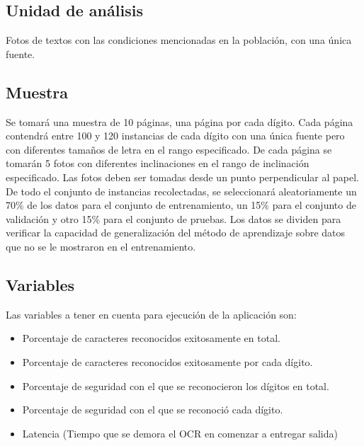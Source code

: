 \documentclass[a4paper, 11pt, oneside]{report}
\begin{document}
\subsection{Unidad de análisis}

Fotos de textos con las condiciones mencionadas en la población, con una única fuente.

\subsection{Muestra}

Se tomará una muestra de 10 páginas, una página por cada dígito. Cada página contendrá entre 100 y 120 instancias de cada dígito con una única fuente pero con diferentes tamaños de letra en el rango especificado. De cada página se tomarán 5 fotos con diferentes inclinaciones en el rango de inclinación especificado. Las fotos deben ser tomadas desde un punto perpendicular al papel. De todo el conjunto de instancias recolectadas, se seleccionará aleatoriamente un 70\% de los datos para el conjunto de entrenamiento, un 15\% para el conjunto de validación y otro 15\% para el conjunto de pruebas. Los datos se dividen para verificar la capacidad de generalización del método de aprendizaje sobre datos que no se le mostraron en el entrenamiento.

\subsection{Variables}

Las variables a tener en cuenta para ejecución de la aplicación son:

\begin{itemize}

	\item Porcentaje de caracteres reconocidos exitosamente en total.

	\item Porcentaje de caracteres reconocidos exitosamente por cada dígito.

	\item Porcentaje de seguridad con el que se reconocieron los dígitos en total.

	\item Porcentaje de seguridad con el que se reconoció cada dígito.

	\item Latencia (Tiempo que se demora el OCR en comenzar a entregar salida)

\end{itemize}
\end{document}
